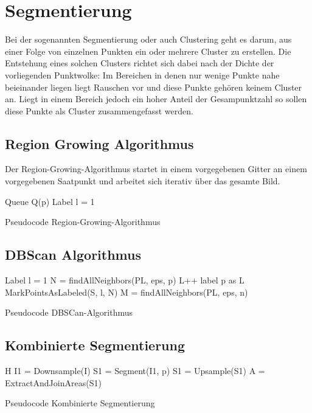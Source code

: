 \chapter{Segmentierung}

Bei der sogenannten Segmentierung oder auch Clustering geht es darum, aus einer Folge von einzelnen Punkten ein oder mehrere Cluster zu erstellen. Die Entstehung eines solchen Clusters richtet sich dabei nach der Dichte der vorliegenden Punktwolke: Im Bereichen in denen nur wenige Punkte nahe beieinander liegen liegt Rauschen vor und diese Punkte geh\"oren keinem Cluster an. Liegt in einem Bereich jedoch ein hoher Anteil der Gesampunktzahl so sollen diese Punkte als Cluster zusammengefasst werden.

\section{Region Growing Algorithmus}

Der Region-Growing-Algorithmus startet in einem vorgegebenen Gitter an einem vorgegebenen Saatpunkt und arbeitet sich iterativ \"uber das gesamte Bild.

\begin{algorithm}[H]
 Queue Q(p) \;
 Label l = 1 \;
 \caption{Pseudocode Region-Growing-Algorithmus}
\end{algorithm}


\section{DBScan Algorithmus}

\begin{algorithm}[H]
 Label l = 1\;
  {
    N = findAllNeighbors(PL, eps, p) \;
    L++\;
    label p as L \;
     {
        MarkPointsAsLabeled(S, l, N)\;
        M = findAllNeighbors(PL, eps, n)\;
    }
 }
 \caption{Pseudocode DBSCan-Algorithmus}
\end{algorithm}

\section{Kombinierte Segmentierung}

\begin{algorithm}{H}
 I1 = Downsample(I) \;
 S1 = Segment(I1, p) \;
 S1 = Upsample(S1) \;
 A = ExtractAndJoinAreas(S1) \;
 \caption{Pseudocode Kombinierte Segmentierung}
\end{algorithm}
